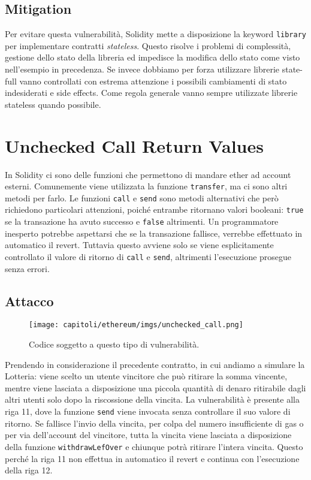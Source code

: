 \subsection{Mitigation}

Per evitare questa vulnerabilità, Solidity mette a disposizione la keyword
\verb|library| per implementare contratti \textit{stateless}.
Questo risolve i problemi di complessità, gestione dello stato della libreria ed
impedisce la modifica dello stato come visto nell'esempio in precedenza.
Se invece dobbiamo per forza utilizzare librerie state-full vanno controllati
con estrema attenzione i possibili cambiamenti di stato indesiderati e side effects.
Come regola generale vanno sempre utilizzate librerie stateless quando possibile.

\section{Unchecked Call Return Values}

In Solidity ci sono delle funzioni che permettono di mandare ether ad account
esterni. Comunemente viene utilizzata la funzione \verb|transfer|, ma ci sono
altri metodi per farlo. Le funzioni \verb|call| e \verb|send| sono metodi
alternativi che però richiedono particolari attenzioni, poiché entrambe
ritornano valori booleani: \verb|true| se la transazione ha avuto successo e
\verb|false| altrimenti. Un programmatore inesperto potrebbe aspettarsi che se
la transazione fallisce, verrebbe effettuato in automatico il revert.
Tuttavia questo avviene solo se viene esplicitamente controllato il valore di
ritorno di \verb|call| e \verb|send|, altrimenti l'esecuzione prosegue senza errori.

\subsection{Attacco}

\begin{figure}[H]
      \centering
      \texttt{[image: capitoli/ethereum/imgs/unchecked\_call.png]}
      \caption{Codice soggetto a questo tipo di vulnerabilità.}
\end{figure}

Prendendo in considerazione il precedente contratto, in cui andiamo a simulare
la Lotteria: viene scelto un utente vincitore che può ritirare la somma vincente,
mentre viene lasciata a disposizione una piccola quantità di denaro ritirabile
dagli altri utenti solo dopo la riscossione della vincita.
La vulnerabilità è presente alla riga 11, dove la funzione \verb|send| viene
invocata senza controllare il suo valore di ritorno. Se fallisce l'invio della
vincita, per colpa del numero insufficiente di gas o per via dell'account del
vincitore, tutta la vincita viene lasciata a disposizione della funzione
\verb|withdrawLefOver| e chiunque potrà ritirare l'intera vincita.
Questo perché la riga 11 non effettua in automatico il revert e continua
con l'esecuzione della riga 12.

